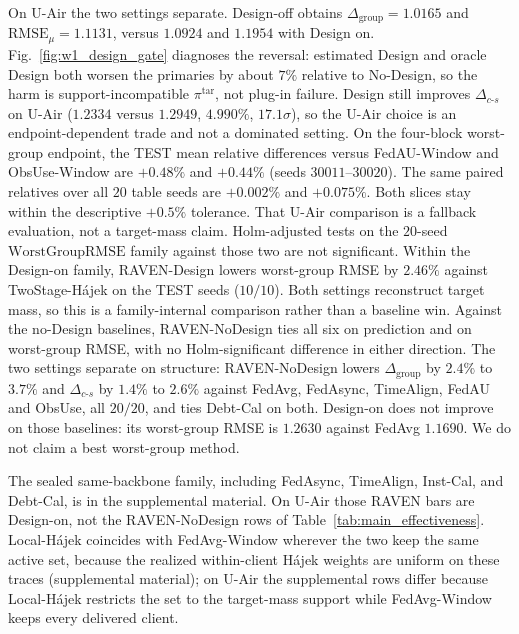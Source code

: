 \documentclass[letterpaper,journal]{IEEEtran}
\begin{document}
On U-Air the two settings separate.  Design-off obtains
$\Delta_{\mathrm{group}}=1.0165$ and $\mathrm{RMSE}_{\mu}=1.1131$,
versus $1.0924$ and $1.1954$ with Design on.  Fig.~\ref{fig:w1_design_gate}
diagnoses the reversal: estimated Design and oracle Design both worsen the
primaries by about $7\%$ relative to No-Design, so the harm is
support-incompatible $\pi^{\mathrm{tar}}$, not plug-in failure.
Design still improves $\Delta_{c\text{-}s}$ on U-Air ($1.2334$ versus
$1.2949$, $4.990\%$, $17.1\sigma$), so the U-Air choice is an
endpoint-dependent trade and not a dominated setting.  On the
four-block worst-group endpoint, the TEST mean relative differences versus
FedAU-Window and ObsUse-Window are $+0.48\%$ and $+0.44\%$
(seeds $30011$--$30020$).
The same paired relatives over all $20$ table seeds are $+0.002\%$ and
$+0.075\%$.
Both slices stay within the descriptive $+0.5\%$ tolerance.  That U-Air comparison is a
fallback evaluation, not a target-mass claim.
Holm-adjusted tests on the $20$-seed $\mathrm{WorstGroupRMSE}$ family against
those two are not significant.
Within the Design-on family, RAVEN-Design lowers worst-group RMSE by $2.46\%$
against TwoStage-H\'ajek on the TEST seeds ($10/10$).  Both settings reconstruct
target mass, so this is a family-internal comparison rather than a baseline win.
Against the no-Design baselines, RAVEN-NoDesign ties all six on prediction and
on worst-group RMSE, with no Holm-significant difference in either direction.
The two settings separate on structure: RAVEN-NoDesign lowers
$\Delta_{\mathrm{group}}$ by $2.4\%$ to $3.7\%$ and $\Delta_{c\text{-}s}$ by
$1.4\%$ to $2.6\%$ against FedAvg, FedAsync, TimeAlign, FedAU and ObsUse, all
$20/20$, and ties Debt-Cal on both.  Design-on does not improve on those
baselines: its worst-group RMSE is $1.2630$ against FedAvg $1.1690$.  We do not
claim a best worst-group method.

The sealed same-backbone family, including FedAsync, TimeAlign,
Inst-Cal, and Debt-Cal, is in the supplemental material.  On U-Air
those RAVEN bars are Design-on, not the RAVEN-NoDesign rows of
Table~\ref{tab:main_effectiveness}.  Local-H\'ajek coincides with
FedAvg-Window wherever the two keep the same active set, because the realized
within-client H\'ajek weights are uniform on these traces (supplemental
material); on U-Air the supplemental rows differ because Local-H\'ajek
restricts the set to the target-mass support while FedAvg-Window keeps every
delivered client.
\end{document}
